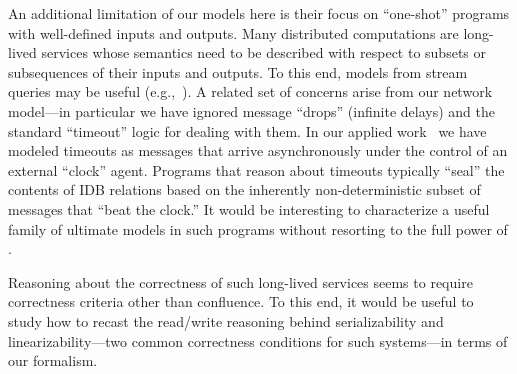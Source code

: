 

An additional limitation of our models here is their focus on ``one-shot'' programs with well-defined inputs and outputs.  Many distributed computations are long-lived services whose semantics need to be described with respect to subsets or subsequences of their inputs and outputs.  To this end, models from stream queries may be useful (e.g.,~\cite{Chandramouli2009}).  A related set of concerns arise from our network model---in particular we have ignored message ``drops'' (infinite delays) and the standard ``timeout'' logic for dealing with them.  In our applied work~\cite{boom,cidr11} we have modeled timeouts as messages that arrive asynchronously under the control of an external ``clock'' agent.  Programs that reason about timeouts typically ``seal'' the contents of IDB relations based on the inherently non-deterministic subset of messages that ``beat the clock.''  It would be interesting to characterize a useful family of ultimate models in such programs without resorting to the full power of \lang.

Reasoning about the correctness of such long-lived services seems to require correctness criteria other than confluence.  To this end, it would be useful to study how to recast the read/write reasoning behind serializability and linearizability---two common correctness conditions for such systems---in terms of our formalism.

